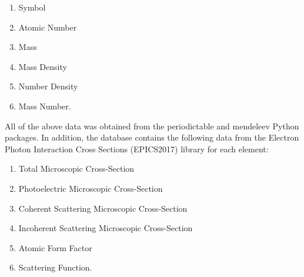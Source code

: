 \begin{enumerate}
    \item Symbol
    \item Atomic Number
    \item Mass
    \item Mass Density
    \item Number Density
    \item Mass Number.
\end{enumerate}

\par All of the above data was obtained from the periodictable \cite{periodictable2022} and mendeleev \cite{mendeleev2021} Python packages. In addition, the database contains the following data from the Electron Photon Interaction Cross Sections (EPICS2017) library \cite{cullen_survey_nodate} for each element:

\begin{enumerate}
    \item Total Microscopic Cross-Section
    \item Photoelectric Microscopic Cross-Section
    \item Coherent Scattering Microscopic Cross-Section
    \item Incoherent Scattering Microscopic Cross-Section
    \item Atomic Form Factor
    \item Scattering Function.
\end{enumerate}

